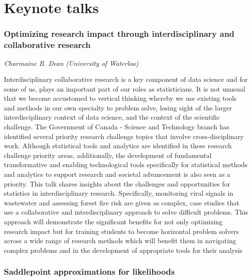 \documentclass[
]{scrreprt}
\begin{document}
\pagestyle{fancy}

\chapter{Keynote talks}\label{keynote-talks}

\subsection{Optimizing research impact through interdisciplinary and
collaborative
research}\label{optimizing-research-impact-through-interdisciplinary-and-collaborative-research}

\emph{Charmaine B. Dean} \emph{(University of
Waterloo)}

\setlength{\parskip}{0.5em}

Interdisciplinary collaborative research is a key component of data
science and for some of us, plays an important part of our roles as
statisticians. It is not unusual that we become accustomed to vertical
thinking whereby we use existing tools and methods in our own specialty
to problem solve, losing sight of the larger interdisciplinary context
of data science, and the context of the scientific challenge. The
Government of Canada - Science and Technology branch has identified
several priority research challenge topics that involve
cross-disciplinary work. Although statistical tools and analytics are
identified in these research challenge priority areas, additionally, the
development of fundamental transformative and enabling technological
tools specifically for statistical methods and analytics to support
research and societal advancement is also seen as a priority. This talk
shares insights about the challenges and opportunities for statistics in
interdisciplinary research. Specifically, monitoring viral signals in
wastewater and assessing forest fire risk are given as complex, case
studies that use a collaborative and interdisciplinary approach to solve
difficult problems. This approach will demonstrate the significant
benefits for not only optimizing research impact but for training
students to become horizontal problem solvers across a wide range of
research methods which will benefit them in navigating complex problems
and in the development of appropriate tools for their analysis

\subsection{Saddlepoint approximations for
likelihoods}\label{saddlepoint-approximations-for-likelihoods}
\end{document}
